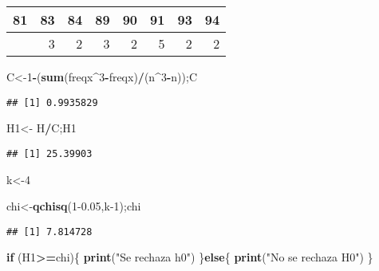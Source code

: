 \documentclass[
]{article}
\newenvironment{Shaded}{\begin{snugshade}}{\end{snugshade}}
\newcommand{\ControlFlowTok}[1]{\textcolor[rgb]{0.13,0.29,0.53}{\textbf{#1}}}
\newcommand{\DecValTok}[1]{\textcolor[rgb]{0.00,0.00,0.81}{#1}}
\newcommand{\FloatTok}[1]{\textcolor[rgb]{0.00,0.00,0.81}{#1}}
\newcommand{\FunctionTok}[1]{\textcolor[rgb]{0.13,0.29,0.53}{\textbf{#1}}}
\newcommand{\NormalTok}[1]{#1}
\newcommand{\OtherTok}[1]{\textcolor[rgb]{0.56,0.35,0.01}{#1}}
\newcommand{\SpecialCharTok}[1]{\textcolor[rgb]{0.81,0.36,0.00}{\textbf{#1}}}
\newcommand{\StringTok}[1]{\textcolor[rgb]{0.31,0.60,0.02}{#1}}
\begin{document}
\begin{longtable}[]{@{}rrrrrrrr@{}}
\toprule\noalign{}
81 & 83 & 84 & 89 & 90 & 91 & 93 & 94 \\
\midrule\noalign{}
\endhead
\bottomrule\noalign{}
\endlastfoot
4 & 3 & 2 & 3 & 2 & 5 & 2 & 2 \\
\end{longtable}

\begin{Shaded}
\begin{Highlighting}[]
\NormalTok{C}\OtherTok{\textless{}{-}}\DecValTok{1}\SpecialCharTok{{-}}\NormalTok{(}\FunctionTok{sum}\NormalTok{(freqx}\SpecialCharTok{\^{}}\DecValTok{3}\SpecialCharTok{{-}}\NormalTok{freqx)}\SpecialCharTok{/}\NormalTok{(n}\SpecialCharTok{\^{}}\DecValTok{3}\SpecialCharTok{{-}}\NormalTok{n));C}
\end{Highlighting}
\end{Shaded}

\begin{verbatim}
## [1] 0.9935829
\end{verbatim}

\begin{Shaded}
\begin{Highlighting}[]
\NormalTok{H1}\OtherTok{\textless{}{-}}\NormalTok{ H}\SpecialCharTok{/}\NormalTok{C;H1}
\end{Highlighting}
\end{Shaded}

\begin{verbatim}
## [1] 25.39903
\end{verbatim}

\begin{Shaded}
\begin{Highlighting}[]
\NormalTok{k}\OtherTok{\textless{}{-}}\DecValTok{4}

\NormalTok{chi}\OtherTok{\textless{}{-}}\FunctionTok{qchisq}\NormalTok{(}\DecValTok{1}\FloatTok{{-}0.05}\NormalTok{,k}\DecValTok{{-}1}\NormalTok{);chi}
\end{Highlighting}
\end{Shaded}

\begin{verbatim}
## [1] 7.814728
\end{verbatim}

\begin{Shaded}
\begin{Highlighting}[]
\ControlFlowTok{if}\NormalTok{ (H1}\SpecialCharTok{\textgreater{}=}\NormalTok{chi)\{}
  \FunctionTok{print}\NormalTok{(}\StringTok{"Se rechaza h0"}\NormalTok{)}
\NormalTok{\}}\ControlFlowTok{else}\NormalTok{\{}
  \FunctionTok{print}\NormalTok{(}\StringTok{"No se rechaza H0"}\NormalTok{)}
\NormalTok{\}}
\end{Highlighting}
\end{Shaded}
\end{document}
